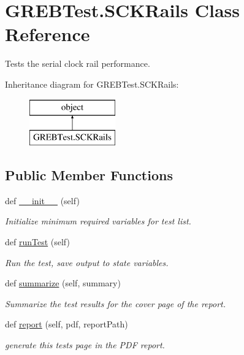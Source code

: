 \hypertarget{class_g_r_e_b_test_1_1_s_c_k_rails}{}\section{G\+R\+E\+B\+Test.\+S\+C\+K\+Rails Class Reference}
\label{class_g_r_e_b_test_1_1_s_c_k_rails}


Tests the serial clock rail performance.  


Inheritance diagram for G\+R\+E\+B\+Test.\+S\+C\+K\+Rails\+:\begin{figure}[H]
\begin{center}
\leavevmode
\includegraphics[height=2.000000cm]{class_g_r_e_b_test_1_1_s_c_k_rails}
\end{center}
\end{figure}
\subsection*{Public Member Functions}
\begin{DoxyCompactItemize}
\item 
def \hyperlink{class_g_r_e_b_test_1_1_s_c_k_rails_aa7f341bfb9332eceb1ca87a4bc258403}{\+\_\+\+\_\+init\+\_\+\+\_\+} (self)
\begin{DoxyCompactList}\small\item\em Initialize minimum required variables for test list. \end{DoxyCompactList}\item 
def \hyperlink{class_g_r_e_b_test_1_1_s_c_k_rails_aba714748d43ade3199da3eecba5feee8}{run\+Test} (self)
\begin{DoxyCompactList}\small\item\em Run the test, save output to state variables. \end{DoxyCompactList}\item 
def \hyperlink{class_g_r_e_b_test_1_1_s_c_k_rails_a32a5630f15fd51d03009bb7daa98c64c}{summarize} (self, summary)
\begin{DoxyCompactList}\small\item\em Summarize the test results for the cover page of the report. \end{DoxyCompactList}\item 
def \hyperlink{class_g_r_e_b_test_1_1_s_c_k_rails_a41aa3fa33b985d4df9d2b6c85b5e4bcb}{report} (self, pdf, report\+Path)
\begin{DoxyCompactList}\small\item\em generate this test\textquotesingle{}s page in the P\+DF report. \end{DoxyCompactList}\end{DoxyCompactItemize}


